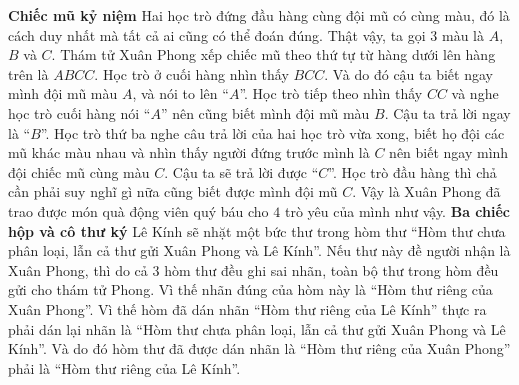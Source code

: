\vskip 0.1cm
\textbf{\color{toancuabi}\color{toancuabi}Chiếc mũ kỷ niệm} 
\vskip 0.1cm
Hai học trò đứng đầu hàng cùng đội mũ có cùng màu, đó là cách duy nhất mà tất cả ai cũng có thể đoán đúng.
\vskip 0.1cm
Thật vậy, ta gọi $3$ màu là $A$, $B$ và $C$. Thám tử Xuân Phong xếp chiếc mũ theo thứ tự từ hàng dưới lên hàng trên là $ABCC$. Học trò ở cuối hàng nhìn thấy $BCC$. Và do đó cậu ta biết ngay mình đội mũ màu $A$, và nói to lên “$A$”.
\vskip 0.1cm
Học trò tiếp theo nhìn thấy $CC$ và nghe học trò cuối hàng nói “$A$” nên cũng biết mình đội mũ màu $B$. Cậu ta trả lời ngay là “$B$”.
\vskip 0.1cm
Học trò thứ ba nghe câu trả lời của hai học trò vừa xong, biết họ đội các mũ khác màu nhau và nhìn thấy người đứng trước mình là $C$ nên biết ngay mình đội chiếc mũ cùng màu $C$. Cậu ta sẽ trả lời được “$C$”.
\vskip 0.1cm
Học  trò đầu hàng  thì chả cần phải suy nghĩ gì nữa cũng biết được mình đội mũ $C$. Vậy là Xuân Phong đã trao được món quà động viên quý báu cho $4$ trò yêu của mình như vậy.
\vskip 0.1cm
\textbf{\color{toancuabi}\color{toancuabi}Ba chiếc hộp và cô thư ký}
\vskip 0.1cm
Lê Kính sẽ nhặt một bức thư trong hòm thư “Hòm thư chưa phân loại, lẫn cả thư gửi Xuân Phong và Lê Kính”. Nếu thư này đề người nhận là Xuân Phong, thì do cả $3$ hòm thư đều ghi sai nhãn, toàn bộ thư trong hòm đều gửi cho thám tử Phong. Vì thế nhãn đúng của hòm này là “Hòm thư riêng của Xuân Phong”.
\vskip 0.1cm
Vì thế hòm đã dán nhãn “Hòm thư riêng của Lê Kính” thực ra phải dán lại nhãn là “Hòm thư chưa phân loại, lẫn cả thư gửi Xuân Phong và Lê Kính”.
\vskip 0.1cm
Và do đó hòm thư đã được dán nhãn là “Hòm thư riêng của Xuân Phong” phải là “Hòm thư riêng của Lê Kính”.
\vskip 0.1cm

